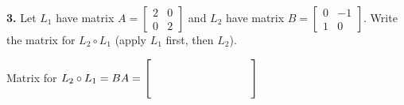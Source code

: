 \documentclass[10pt]{article}
\begin{document}
\vspace{0.10in}

\begin{notesbox}
\textbf{3.} Let $L_1$ have matrix $A=\begin{bmatrix}2&0\\0&2\end{bmatrix}$ and
$L_2$ have matrix $B=\begin{bmatrix}0&-1\\1&0\end{bmatrix}$.
Write the matrix for $L_2\circ L_1$ (apply $L_1$ first, then $L_2$).

\vspace{0.06in}
Matrix for $L_2\circ L_1 = BA = \begin{bmatrix}\hspace{1.4cm}&\hspace{1.4cm}\\[10pt]\hspace{1.4cm}&\hspace{1.4cm}\end{bmatrix}$

\end{notesbox}
\end{document}
